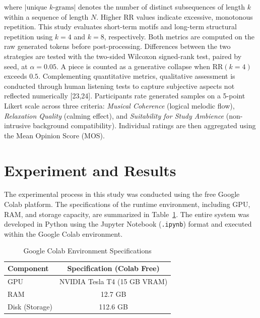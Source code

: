 \documentclass[conference,a4paper]{IEEEtran}
\begin{document}
\noindent where $|\text{unique }k\text{-grams}|$ denotes the number of distinct subsequences of length $k$ within a sequence of length $N$. Higher RR values indicate excessive, monotonous repetition. This study evaluates short-term motifs and long-term structural repetition using $k=4$ and $k=8$, respectively. Both metrics are computed on the raw generated tokens before post-processing. Differences between the two strategies are tested with the two-sided Wilcoxon signed-rank test, paired by seed, at $\alpha = 0.05$. A piece is counted as a generative collapse when $\text{RR}(k=4)$ exceeds $0.5$. Complementing quantitative metrics, qualitative assessment is conducted through human listening tests to capture subjective aspects not reflected numerically [23,24]. Participants rate generated samples on a 5-point Likert scale across three criteria: \textit{Musical Coherence} (logical melodic flow), \textit{Relaxation Quality} (calming effect), and \textit{Suitability for Study Ambience} (non-intrusive background compatibility). Individual ratings are then aggregated using the Mean Opinion Score (MOS).

\section{Experiment and Results}
The experimental process in this study was conducted using the free Google Colab platform. The specifications of the runtime environment, including GPU, RAM, and storage capacity, are summarized in Table~\ref{tab:colab_specs}. The entire system was developed in Python using the Jupyter Notebook (\texttt{.ipynb}) format and executed within the Google Colab environment. 

\begin{table}[htbp]
\centering
\caption{Google Colab Environment Specifications}
\label{tab:colab_specs}
\begin{tabular}{lc}
\hline
\textbf{Component} & \textbf{Specification (Colab Free)} \\
\hline
GPU               & NVIDIA Tesla T4 (15 GB VRAM) \\
RAM               & 12.7 GB \\
Disk (Storage)    & 112.6 GB \\
\hline
\end{tabular}
\end{table}
\end{document}
